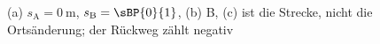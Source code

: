 (a) $s_\mathrm{A} = \SI{0}{\meter}$, $s_\mathrm{B} = \sBP{0}{1}$, (b) B, (c)  ist die Strecke, nicht die Ortsänderung; der Rückweg zählt negativ
